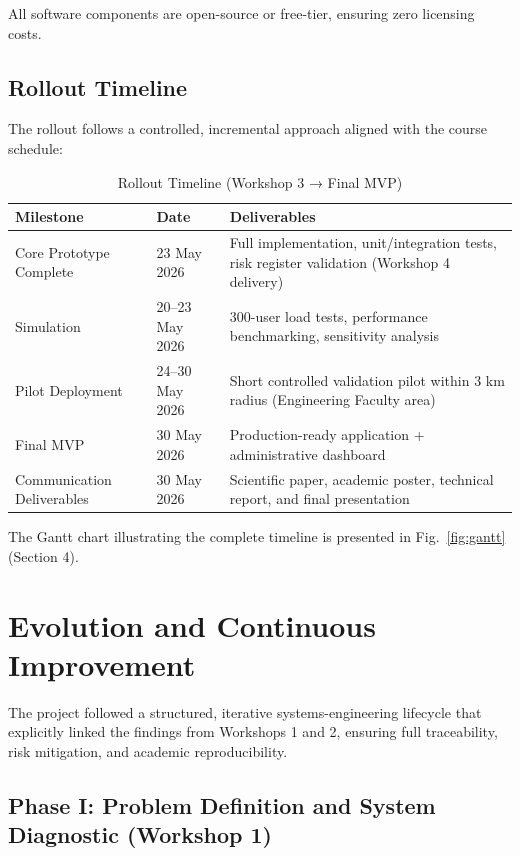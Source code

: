 \documentclass[9pt,conference]{IEEEtran}
\begin{document}
All software components are open-source or free-tier, ensuring zero licensing costs.

\subsection{Rollout Timeline}

The rollout follows a controlled, incremental approach aligned with the course schedule:

\begin{table}[h]
\centering
\small
\caption{Rollout Timeline (Workshop 3 → Final MVP)}
\label{tab:rollout-timeline}
\begin{tabular}{@{}p{1.8cm}p{2.8cm}p{3.5cm}@{}}
\toprule
\textbf{Milestone} & \textbf{Date} & \textbf{Deliverables} \\
\midrule
Core Prototype Complete & 23 May 2026 & Full implementation, unit/integration tests, risk register validation (Workshop 4 delivery) \\
Simulation & 20--23 May 2026 & 300-user load tests, performance benchmarking, sensitivity analysis \\
Pilot Deployment & 24--30 May 2026 & Short controlled validation pilot within 3 km radius (Engineering Faculty area) \\
Final MVP & 30 May 2026 & Production-ready application + administrative dashboard \\
Communication Deliverables & 30 May 2026 & Scientific paper, academic poster, technical report, and final presentation \\
\bottomrule
\end{tabular}
\end{table}

The Gantt chart illustrating the complete timeline is presented in Fig.~\ref{fig:gantt} (Section 4).

\section{Evolution and Continuous Improvement}

The project followed a structured, iterative systems-engineering lifecycle that explicitly linked the findings from Workshops 1 and 2, ensuring full traceability, risk mitigation, and academic reproducibility.

\subsection{Phase I: Problem Definition and System Diagnostic (Workshop 1)}
\end{document}
